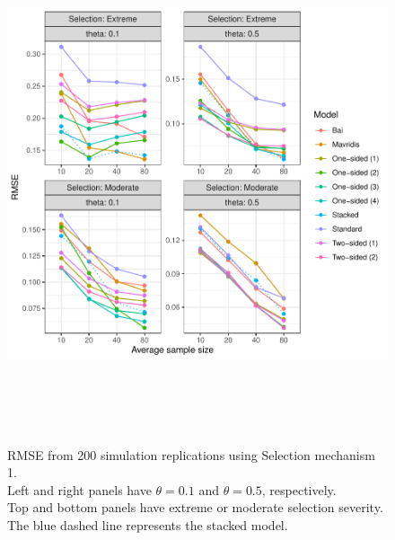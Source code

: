 \documentclass[12pt]{article}   	%
\numberwithin{equation}{section}
\begin{document}
\begin{figure}
\includegraphics[height = 6in, width = 6.5in]{sim1_plot_rmse.pdf}
\caption{RMSE from 200 simulation replications using Selection mechanism 1. \\
	      Left and right panels have $\theta=0.1$ and $\theta = 0.5$, respectively. \\
	      Top and bottom panels have extreme or moderate selection severity. \\
	      The blue dashed line represents the stacked model.}
\label{fig:sim1_plot_rmse}
\end{figure}
\end{document}
